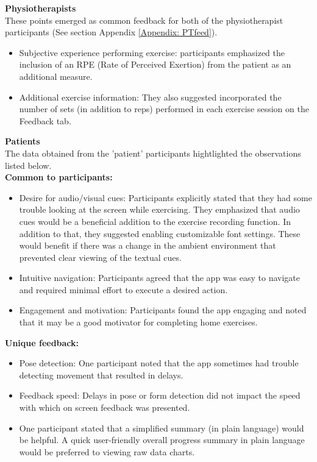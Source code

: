 \documentclass[12pt, titlepage]{article}
\begin{document}
\noindent \textbf{Physiotherapists} \\
These points emerged as common feedback for both of the physiotherapist participants (See section Appendix \ref{Appendix: PTfeed}). 
\begin{itemize}
    \item Subjective experience performing exercise: participants emphasized the inclusion of an RPE (Rate of Perceived Exertion) from the patient
    as an additional measure.
    \item Additional exercise information: They also suggested incorporated the number of sets (in addition to reps) performed in each exercise session on the 
    Feedback tab.
\end{itemize}

\noindent \textbf{Patients} \\
The data obtained from the 'patient' participants hightlighted the observations listed below. \\
\textbf{Common to participants:}
\begin{itemize}
    \item Desire for audio/visual cues: Participants explicitly stated that they had some trouble looking 
    at the screen while exercising. They emphasized that audio cues would be a beneficial addition to the
    exercise recording function. In addition to that, they suggested enabling customizable font settings. 
    These would benefit if there was a change in the ambient environment that prevented clear viewing 
    of the textual cues.
    \item Intuitive navigation: Participants agreed that the app was easy to navigate and required 
    minimal effort to execute a desired action.
    \item Engagement and motivation: Participants found the app engaging and noted that it may be a good
    motivator for completing home exercises. 
\end{itemize}
\textbf{Unique feedback:} 
\begin{itemize}
    \item Pose detection: One participant noted that the app sometimes had trouble detecting movement that
    resulted in delays. 
    \item Feedback speed: Delays in pose or form detection did not impact the speed with which on screen
    feedback was presented. 
    \item One participant stated that a simplified summary (in plain language) would be helpful. A quick
    user-friendly overall progress summary in plain language would be preferred to viewing raw data charts.
\end{itemize}
\end{document}
